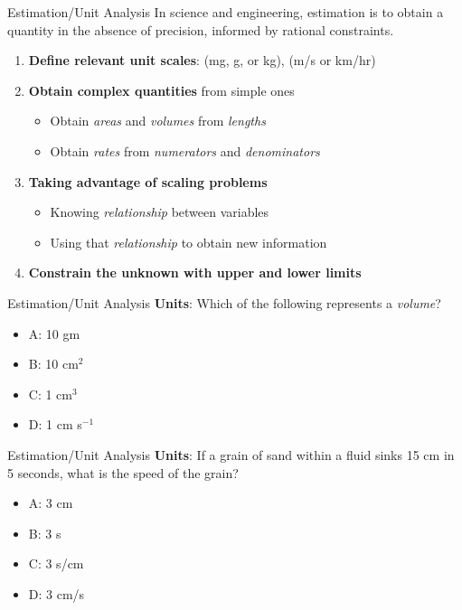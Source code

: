 \documentclass{beamer}
\begin{document}
\begin{frame}{Estimation/Unit Analysis}
In science and engineering, \alert{estimation} is to obtain a quantity in the absence of precision, informed by rational constraints.
\begin{enumerate}
\item \textbf{Define relevant \alert{unit scales}}: (mg, g, or kg), (m/s or km/hr)
\item \textbf{Obtain \alert{complex quantities}} from simple ones
\begin{itemize}
\item Obtain \textit{areas} and \textit{volumes} from \textit{lengths}
\item Obtain \textit{rates} from \textit{numerators} and \textit{denominators}
\end{itemize}
\item \textbf{Taking advantage of \alert{scaling problems}}
\begin{itemize}
\item Knowing \textit{relationship} between variables
\item Using that \textit{relationship} to obtain new information
\end{itemize}
\item \textbf{Constrain the unknown with \alert{upper} and \alert{lower} limits}
\end{enumerate}
\end{frame}

\begin{frame}{Estimation/Unit Analysis}
\textbf{Units}: Which of the following represents a \textit{volume}?
\begin{itemize}
\item A: 10 gm
\item B: 10 cm$^2$
\item C: 1 cm$^3$
\item D: 1 cm s$^{-1}$
\end{itemize}
\end{frame}

\begin{frame}{Estimation/Unit Analysis}
\textbf{Units}: If a grain of sand within a fluid sinks 15 cm in 5 seconds, what is the speed of the grain?
\begin{itemize}
\item A: 3 cm
\item B: 3 s
\item C: 3 s/cm
\item D: 3 cm/s
\end{itemize}
\end{frame}
\end{document}
